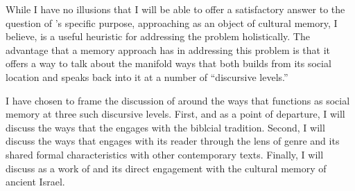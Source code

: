 While I have no illusions that I will be able to offer a satisfactory answer to the question of \ga's specific purpose, approaching \ga as an object of cultural memory, I believe, is a useful heuristic for addressing the problem holistically. The advantage that a memory approach has in addressing this problem is that it offers a way to talk about the manifold ways that \ga both builds from its social location and speaks back into it at a number of ``discursive levels.''

I have chosen to frame the discussion of \ga around the ways that \ga functions as social memory at three such discursive levels. First, and as a point of departure, I will discuss the ways that the \ga engages with the biblcial tradition. Second, I will discuss the ways that \ga engages with its reader through the lens of genre and its shared formal characteristics with other contemporary texts. Finally, I will discuss \ga as a work of \psy and its direct engagement with the cultural memory of ancient Israel.

